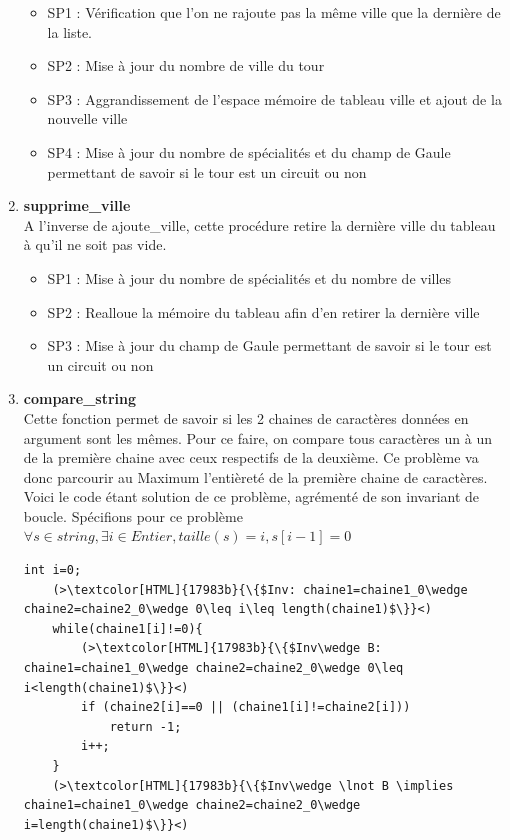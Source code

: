 \documentclass[a4paper, 11pt, oneside]{article}
\begin{document}
\begin{enumerate}
    \begin{itemize}
        \item SP1 : Vérification que l'on ne rajoute pas la même ville que la dernière de la liste.
        \item SP2 : Mise à jour du nombre de ville du tour
        \item SP3 : Aggrandissement de l'espace mémoire de tableau ville et ajout de la nouvelle ville
        \item SP4 : Mise à jour du nombre de spécialités et du champ de Gaule permettant de savoir 
        si le tour est un circuit ou non
    \end{itemize}
    \item \textbf{supprime\_ville}
    \\A l'inverse de ajoute\_ville, cette procédure retire la dernière ville du tableau à
    qu'il ne soit pas vide.
    \begin{itemize}
        \item SP1 : Mise à jour du nombre de spécialités et du nombre de villes
        \item SP2 : Realloue la mémoire du tableau afin d'en retirer la dernière ville
        \item SP3 : Mise à jour du champ de Gaule permettant de savoir si le tour est un circuit ou non
    \end{itemize}
    \item \textbf{compare\_string}
    \\Cette fonction permet de savoir si les 2 chaines de caractères données en argument 
    sont les mêmes. Pour ce faire, on compare tous caractères un à un de la première chaine 
    avec ceux respectifs de la deuxième.
    Ce problème va donc parcourir au Maximum l'entièreté de la première chaine de caractères.
    \\Voici le code étant solution de ce problème, agrémenté de son invariant de boucle.
    Spécifions pour ce problème $\forall s\in string, \exists i\in Entier, taille(s)=i, s[i-1]=0$
    \begin{lstlisting}[caption = {code comparaison de 2 chaines de caractères}]
    int i=0;
    (>\textcolor[HTML]{17983b}{\{$Inv: chaine1=chaine1_0\wedge chaine2=chaine2_0\wedge 0\leq i\leq length(chaine1)$\}}<)
    while(chaine1[i]!=0){
        (>\textcolor[HTML]{17983b}{\{$Inv\wedge B: chaine1=chaine1_0\wedge chaine2=chaine2_0\wedge 0\leq i<length(chaine1)$\}}<)
        if (chaine2[i]==0 || (chaine1[i]!=chaine2[i]))
            return -1;
        i++;
    }
    (>\textcolor[HTML]{17983b}{\{$Inv\wedge \lnot B \implies chaine1=chaine1_0\wedge chaine2=chaine2_0\wedge i=length(chaine1)$\}}<)

\end{lstlisting}
\end{enumerate}
\end{document}
